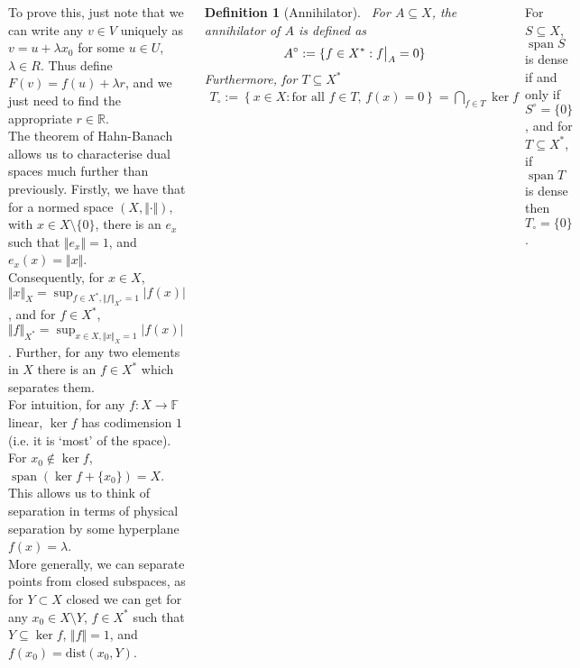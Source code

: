 \documentclass{tikzposter} %
\DeclareMathOperator{\Span}{span}
\newcommand\restr[2]{{%
  \left.\kern-\nulldelimiterspace %
  #1 %
  \vphantom{\big|} %
  \right|_{#2} %
  }}
\newtheorem{definition}{Definition}
\begin{document}
\begin{columns}
{    To prove this, just note that we can write any $v \in V$ uniquely as $v = u+\lambda x_{0}$ for some $u \in U$, $\lambda \in R$. Thus define $F(v) = f(u)+\lambda r$, and we just need to find the appropriate $r \in \mathbb{R}$. \\

    The theorem of Hahn-Banach allows us to characterise dual spaces much further than previously. Firstly, we have that for a normed space $(X, \Vert \cdot \Vert)$, with $x \in X \setminus \{0\}$, there is an $e_{x}$ such that $\Vert e_{x}\Vert = 1$, and $e_{x}(x) = \Vert x \Vert$. \\

    Consequently, for $x \in X$, $\Vert x \Vert_{X} = \sup_{f \in X^{*},\Vert f \Vert_{X^{*}} = 1} |f(x)|$, and for $f \in X^{*}$, $\Vert f \Vert_{X^{*}} = \sup_{x \in X,\Vert x \Vert_{X} = 1} |f(x)|$. Further, for any two elements in $X$ there is an $f \in X^{*}$ which separates them. \\

    For intuition, for any $f : X \to \mathbb{F}$ linear, $\ker f$ has codimension $1$ (i.e. it is `most' of the space). For $x_{0} \not\in \ker f$, $\Span(\ker f + \{x_{0}\}) = X$. This allows us to think of separation in terms of physical separation by some hyperplane $f(x) = \lambda$. \\

    More generally, we can separate points from closed subspaces, as for $Y \subset X$ closed we can get for any $x_{0} \in X \setminus Y$, $f \in X^{*}$ such that $Y \subseteq \ker f$, $\Vert f \Vert = 1$, and $f(x_{0}) = \mathrm{dist} (x_{0}, Y)$. \\

    \begin{definition}[Annihilator]
    \ For $A \subseteq X$, the annihilator of $A$ is defined as
    \begin{align*}
      A^{\circ} := \{f \in X^{*} : \restr{f}{A} = 0\}
    \end{align*}
    Furthermore, for $T \subseteq X^{*}$
    \begin{align*}
      T_{\circ} := \left\{x \in X : \text{for all }f \in T,\,f(x)=0\right\} = \bigcap_{f \in T} \ker f
    \end{align*}
    \end{definition}
    \hphantom{}

    For $S \subseteq X$, $\Span S$ is dense if and only if $S^{\circ} = \{0\}$, and for $T \subseteq X^{*}$, if $\Span T$ is dense then $T_{\circ} = \{0\}$. \\

}
\end{columns}
\end{document}
